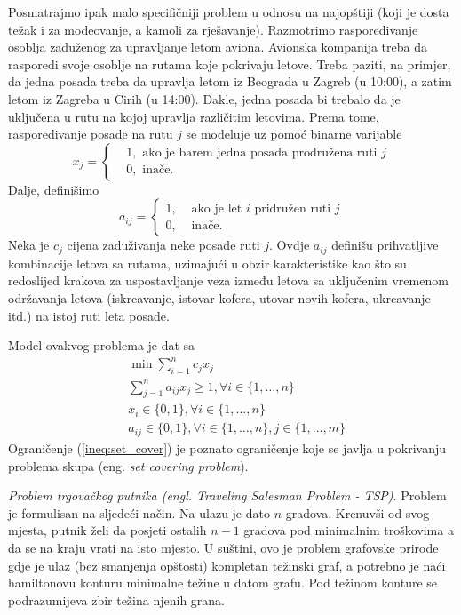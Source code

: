 \documentclass[a4paper, utf8, 11pt, colorlinks]{book}
\begin{document}
Posmatrajmo ipak malo specifičniji problem u odnosu na najopštiji (koji je dosta težak i za modeovanje, a kamoli za rješavanje). 
Razmotrimo raspoređivanje osoblja zaduženog za upravljanje letom aviona. 
Avionska kompanija treba da rasporedi svoje osoblje na rutama koje pokrivaju letove. Treba paziti, na primjer, da jedna posada treba da upravlja letom iz  Beograda u Zagreb (u 10:00), a zatim letom iz Zagreba u Cirih (u 14:00). Dakle, jedna posada bi trebalo da je uključena u rutu na kojoj upravlja različitim letovima. Prema tome, raspoređivanje posade na rutu $j$ se modeluje uz pomoć binarne varijable 
$$x_j = \begin{cases}
    &1, \mbox{ ako je barem jedna posada prodružena ruti } j \\
    &0, \mbox{ inače}. 
\end{cases}
$$
Dalje, definišimo 
$$a_{ij}= \begin{cases}
             1,& \mbox{ ako je let } i \mbox{ pridružen ruti } j \\
             0,& \mbox{ inače}.
        \end{cases}
$$
Neka je $c_j$ cijena zaduživanja neke posade ruti $j$. Ovdje $a_{ij}$ definišu prihvatljive kombinacije letova sa rutama, uzimajući u obzir  karakteristike kao što su redoslijed krakova za uspostavljanje veza između letova sa uključenim vremenom  održavanja letova (iskrcavanje, istovar  kofera, utovar   novih kofera, ukrcavanje itd.) na istoj ruti leta posade.   

Model ovakvog problema je dat sa 
\begin{align}
    &\min \sum_{i=1}^n c_j x_j \nonumber\\
    & \sum_{j=1}^n a_{ij} x_j \geq 1, \forall i \in \{1,\ldots, n\} \label{ineq:set_cover} \\
    & x_i \in \{0, 1 \}, \forall i \in \{1, \ldots, n\} \\
    & a_{ij} \in \{0, 1\}, \forall i \in \{1, \ldots, n\}, j \in\{1,\ldots, m\} \nonumber
\end{align}
Ograničenje (\ref{ineq:set_cover}) je poznato ograničenje koje se javlja u pokrivanju problema skupa (eng. \emph{set covering problem}).

\emph{Problem trgovačkog putnika (engl. Traveling Salesman Problem - TSP)}. Problem je formulisan na sljedeći način. Na ulazu je dato $n$ gradova. Krenuvši od svog mjesta, putnik želi da posjeti ostalih $n-1$ gradova pod minimalnim troškovima a da se na kraju vrati na isto mjesto. U suštini, ovo je problem grafovske prirode gdje je ulaz (bez smanjenja opštosti) kompletan težinski graf, a potrebno je naći hamiltonovu konturu minimalne težine u datom grafu. Pod težinom konture se podrazumijeva zbir težina njenih grana. 
\end{document}
